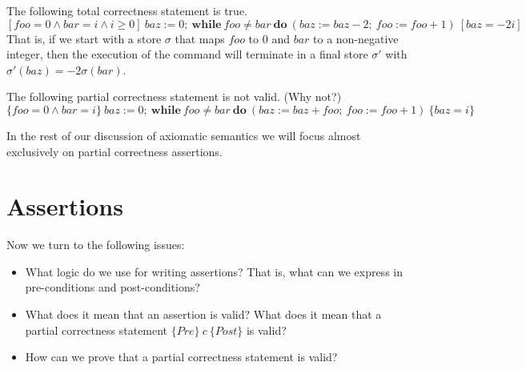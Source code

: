 The following total correctness statement is true.
\[
[\mathit{foo} = 0 \wedge \mathit{bar} = i \wedge i \geq 0]\ \mathit{baz} := 0;\
\mathbf{while}\ \mathit{foo} \neq \mathit{bar}\ \mathbf{do}\ (\mathit{baz} := \mathit{baz} -
2;\ \mathit{foo} := \mathit{foo} + 1)\ [\mathit{baz} = -2i]
\]
That is, if we start with a store $\sigma$ that maps $\mathit{foo}$ to $0$ and $\mathit{bar}$ to
a non-negative integer, then the execution of the command will terminate in a final store
$\sigma'$ with $\sigma'(\mathit{baz}) = -2\sigma(\mathit{bar})$.

The following partial correctness statement is not valid. (Why not?)
\[
\{\mathit{foo} = 0 \wedge \mathit{bar} = i\}\ \mathit{baz} := 0;\ \mathbf{while}\ \mathit{foo}
\neq \mathit{bar}\ \mathbf{do}\ (\mathit{baz} := \mathit{baz} + \mathit{foo};\ \mathit{foo} :=
\mathit{foo} + 1)\ \{\mathit{baz} = i\}
\]

In the rest of our discussion of axiomatic semantics we will focus almost exclusively on
partial correctness assertions.

\section{Assertions}

Now we turn to the following issues:
\begin{itemize}
    \item What logic do we use for writing assertions? That is, what can we express in
    pre-conditions and post-conditions?
    \item What does it mean that an assertion is valid? What does it mean that a partial
    correctness statement $\{\mathit{Pre}\}\ c\ \{\mathit{Post}\}$ is valid?
    \item How can we prove that a partial correctness statement is valid?
\end{itemize}

